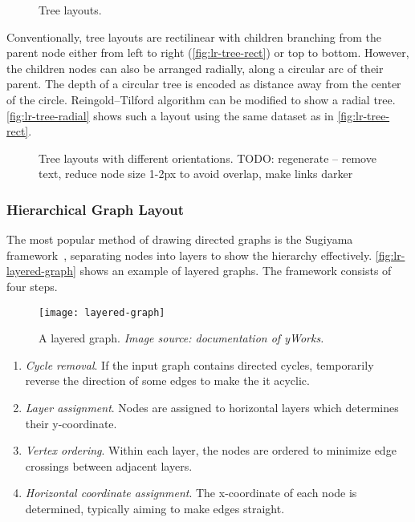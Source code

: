 \begin{figure}[!htb]
\centering
{}
\hfill
{}
\caption{Tree layouts.}
\end{figure}

Conventionally, tree layouts are rectilinear with children branching from the parent node either from left to right (\autoref{fig:lr-tree-rect}) or top to bottom. However, the children nodes can also be arranged radially, along a circular arc of their parent. The depth of a circular tree is encoded as distance away from the center of the circle. Reingold--Tilford algorithm can be modified to show a radial tree. \autoref{fig:lr-tree-radial} shows such a layout using the same dataset as in \autoref{fig:lr-tree-rect}.

\begin{figure}[!htb]
\centering
{}
\hfill
{}
\caption{Tree layouts with different orientations. TODO: regenerate -- remove text, reduce node size 1-2px to avoid overlap, make links darker}
\end{figure}
  
\subsubsection{Hierarchical Graph Layout}	
The most popular method of drawing directed graphs is the Sugiyama framework~\cite{Sugiyama1981}, separating nodes into layers to show the hierarchy effectively. \autoref{fig:lr-layered-graph} shows an example of layered graphs. The framework consists of four steps.

\begin{figure}[!htb]
	\centering
	\texttt{[image: layered-graph]}
	\caption{A layered graph. \textrm{\emph{Image source: documentation of yWorks.}}}
	\label{fig:lr-layered-graph}
\end{figure}

\begin{enumerate}
	\item \emph{Cycle removal}. If the input graph contains directed cycles, temporarily reverse the direction of some edges to make the it acyclic.
	\item \emph{Layer assignment}. Nodes are assigned to horizontal layers which determines their y-coordinate.
	\item \emph{Vertex ordering}. Within each layer, the nodes are ordered to minimize edge crossings between adjacent layers.
	\item \emph{Horizontal coordinate assignment}. The x-coordinate of each node is determined, typically aiming to make edges straight.
\end{enumerate}

